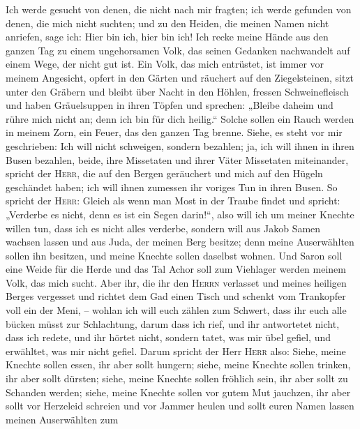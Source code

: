  Ich werde gesucht von denen, die nicht nach mir fragten;
ich werde gefunden von denen, die mich nicht suchten; und zu den Heiden,
die meinen Namen nicht anriefen, sage ich: Hier bin ich, hier bin ich!
 Ich recke meine Hände aus den ganzen Tag zu einem
ungehorsamen Volk, das seinen Gedanken nachwandelt auf einem Wege, der
nicht gut ist.  Ein Volk, das mich entrüstet, ist immer
vor meinem Angesicht, opfert in den Gärten und räuchert auf den
Ziegelsteinen,  sitzt unter den Gräbern und bleibt über
Nacht in den Höhlen, fressen Schweinefleisch und haben Gräuelsuppen in
ihren Töpfen  und sprechen: „Bleibe daheim und rühre mich
nicht an; denn ich bin für dich heilig.`` Solche sollen ein Rauch werden
in meinem Zorn, ein Feuer, das den ganzen Tag brenne. 
Siehe, es steht vor mir geschrieben: Ich will nicht schweigen, sondern
bezahlen; ja, ich will ihnen in ihren Busen bezahlen, 
beide, ihre Missetaten und ihrer Väter Missetaten miteinander, spricht
der \textsc{Herr}, die auf den Bergen geräuchert und mich auf den Hügeln
geschändet haben; ich will ihnen zumessen ihr voriges Tun in ihren
Busen.  So spricht der \textsc{Herr}: Gleich als wenn man
Most in der Traube findet und spricht: „Verderbe es nicht, denn es ist
ein Segen darin!{}``, also will ich um meiner Knechte willen tun, dass
ich es nicht alles verderbe,  sondern will aus Jakob Samen
wachsen lassen und aus Juda, der meinen Berg besitze; denn meine
Auserwählten sollen ihn besitzen, und meine Knechte sollen daselbst
wohnen.  Und Saron soll eine Weide für die Herde und das
Tal Achor soll zum Viehlager werden meinem Volk, das mich sucht.
 Aber ihr, die ihr den \textsc{Herrn} verlasset und
meines heiligen Berges vergesset und richtet dem Gad einen Tisch und
schenkt vom Trankopfer voll ein der Meni, --  wohlan ich
will euch zählen zum Schwert, dass ihr euch alle bücken müsst zur
Schlachtung, darum dass ich rief, und ihr antwortetet nicht, dass ich
redete, und ihr hörtet nicht, sondern tatet, was mir übel gefiel, und
erwähltet, was mir nicht gefiel.  Darum spricht der Herr
\textsc{Herr} also: Siehe, meine Knechte sollen essen, ihr aber sollt
hungern; siehe, meine Knechte sollen trinken, ihr aber sollt dürsten;
siehe, meine Knechte sollen fröhlich sein, ihr aber sollt zu Schanden
werden;  siehe, meine Knechte sollen vor gutem Mut
jauchzen, ihr aber sollt vor Herzeleid schreien und vor Jammer heulen
 und sollt euren Namen lassen meinen Auserwählten zum
